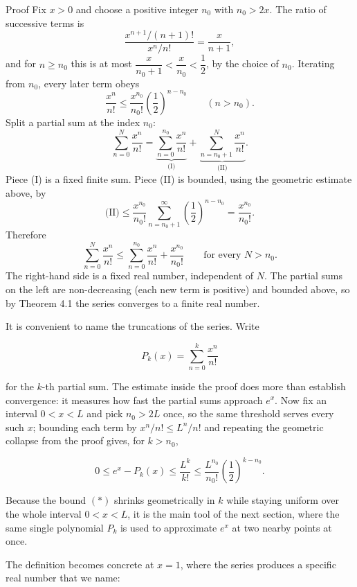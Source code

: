 \documentclass[a4paper,12pt,oneside]{memoir}
\begin{document}
\begin{envproof}{Proof}{}{}
Fix \(x > 0\) and choose a positive integer \(n_{0}\) with \(n_{0} > 2x\). The ratio of successive terms is \[ \frac{x^{n + 1}/(n + 1)!}{x^{n}/n!} = \frac{x}{n + 1}, \] and for \(n \ge n_{0}\) this is at most \(\dfrac{x}{n_{0} + 1} < \dfrac{x}{n_{0}} < \dfrac{1}{2}\), by the choice of \(n_{0}\). Iterating from \(n_{0}\), every later term obeys \[ \frac{x^{n}}{n!} \le \frac{x^{n_{0}}}{n_{0}!} \left(\frac{1}{2}\right)^{n - n_{0}} \qquad (n > n_{0}). \] Split a partial sum at the index \(n_{0}\): \[ \sum_{n = 0}^{N} \frac{x^{n}}{n!} = \underbrace{\sum_{n = 0}^{n_{0}} \frac{x^{n}}{n!}}_{\text{(I)}} + \underbrace{\sum_{n = n_{0} + 1}^{N} \frac{x^{n}}{n!}}_{\text{(II)}}. \] Piece (I) is a fixed finite sum. Piece (II) is bounded, using the geometric estimate above, by \[ \text{(II)} \le \frac{x^{n_{0}}}{n_{0}!} \sum_{n = n_{0} + 1}^{\infty} \left(\frac{1}{2}\right)^{n - n_{0}} = \frac{x^{n_{0}}}{n_{0}!}. \] Therefore \[ \sum_{n = 0}^{N} \frac{x^{n}}{n!} \le \sum_{n = 0}^{n_{0}} \frac{x^{n}}{n!} + \frac{x^{n_{0}}}{n_{0}!} \qquad \text{for every } N > n_{0}. \] The right-hand side is a fixed real number, independent of \(N\). The partial sums on the left are non-decreasing (each new term is positive) and bounded above, so by Theorem 4.1 the series converges to a finite real number. \qedmark
\end{envproof}
It is convenient to name the truncations of the series. Write

\[ P_{k}(x) = \sum_{n = 0}^{k} \frac{x^{n}}{n!} \]

for the \(k\)-th partial sum. The estimate inside the proof does more than establish convergence: it measures how fast the partial sums approach \(e^{x}\). Now fix an interval \(0 < x < L\) and pick \(n_{0} > 2L\) once, so the same threshold serves every such \(x\); bounding each term by \(x^{n}/n! \le L^{n}/n!\) and repeating the geometric collapse from the proof gives, for \(k > n_{0}\),

\[ 0 \le e^{x} - P_{k}(x) \le \frac{L^{k}}{k!} \le \frac{L^{n_{0}}}{n_{0}!} \left(\frac{1}{2}\right)^{k - n_{0}}. \tag{$*$} \]

Because the bound \((*)\) shrinks geometrically in \(k\) while staying uniform over the whole interval \(0 < x < L\), it is the main tool of the next section, where the same single polynomial \(P_{k}\) is used to approximate \(e^{x}\) at two nearby points at once.

The definition becomes concrete at \(x = 1\), where the series produces a specific real number that we name:
\end{document}
